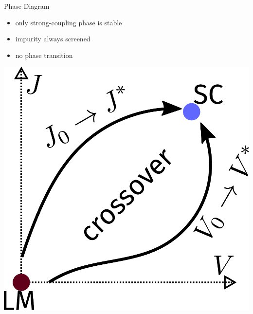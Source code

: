 \documentclass[aspectratio=169]{beamer}
\begin{document}
\begin{frame}[noframenumbering]{Phase Diagram}
\centering
\begin{minipage}{0.5\textwidth}
	\begin{itemize}
	\item only strong-coupling phase is stable
	\item impurity always screened
	\item no phase transition
	\end{itemize}
\end{minipage}
\hspace*{\fill}
\begin{minipage}{0.4\textwidth}
\includegraphics[width=\textwidth]{./figures/phase_diagram_zero.pdf}
\end{minipage}
\end{frame}
\end{document}
